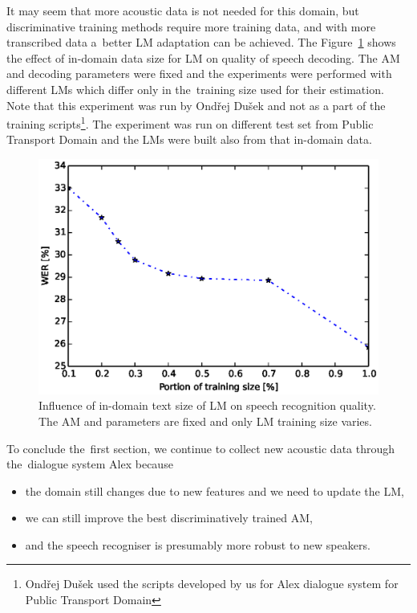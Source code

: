 It may seem that more acoustic data is not needed for this domain, but discriminative training methods require more training data, and with more transcribed data a~better \ac{LM} adaptation can be achieved.
The Figure~\ref{fig:partials_lm} shows the effect of in-domain data size for \ac{LM} on quality of speech decoding.
The \ac{AM}  and decoding parameters were fixed and the experiments were performed with different \acp{LM} which differ only in the~training size used for their estimation. 
Note that this experiment was run by Ondřej Dušek and not as a part of the training scripts\footnote{Ondřej Dušek used the scripts developed by us for Alex dialogue system for Public Transport Domain}.
The experiment was run on different test set from Public Transport Domain and the \acp{LM} were built also from that in-domain data.
\begin{figure}[!htp]
    \begin{center}
    \includegraphics[scale=0.7]{images/partial-lm-tri2b-bmmi.ps}
    \caption{Influence of in-domain text size of \ac{LM} on speech recognition quality. The \ac{AM}  and parameters are fixed and only \ac{LM} training size varies.}
    \label{fig:partials_lm} 
    \end{center}
\end{figure}

To conclude the~first section, we continue to collect new acoustic data through the~dialogue system Alex because
\begin{itemize}
    \item the domain still changes due to new features and we need to update the \ac{LM},
    \item we can still improve the best discriminatively trained \ac{AM},
    \item and the speech recogniser is presumably more robust to new speakers.
\end{itemize}

